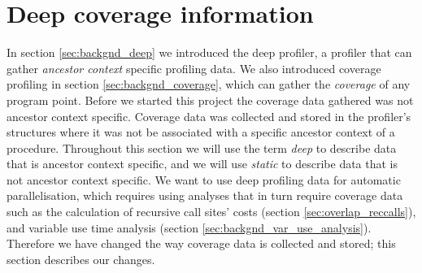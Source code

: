 \section{Deep coverage information}
\label{sec:overlap_coverage}


In section \ref{sec:backgnd_deep} we introduced the deep profiler,
a profiler that can gather \emph{ancestor context} specific profiling data.
We also introduced coverage profiling in section \ref{sec:backgnd_coverage},
which can gather the \emph{coverage} of any program point.
Before we started this project the coverage data gathered was not ancestor
context specific.
Coverage data was collected and stored in the profiler's \PS
structures where it was not be associated with a specific ancestor context of
a procedure.
Throughout this section we will use the term \emph{deep} to describe data
that is ancestor context specific,
and we will use \emph{static} to describe data that is not ancestor
context specific.
We want to use deep profiling data for automatic parallelisation,
which requires using analyses that in turn require coverage data such as
the calculation of recursive call sites' costs
(section \ref{sec:overlap_reccalls}),
and variable use time analysis (section \ref{sec:backgnd_var_use_analysis}).
Therefore we have changed the way coverage data is collected and stored;
this section describes our changes.

